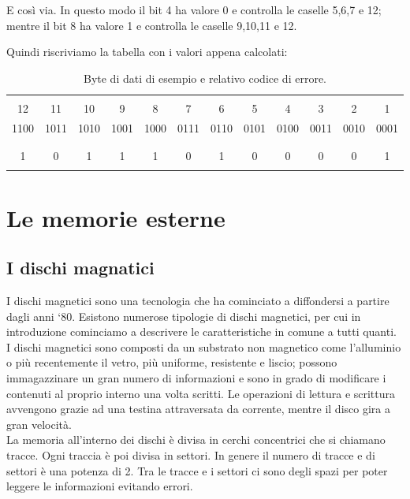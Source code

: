 \documentclass{article}
\begin{document}
 E così via. In questo modo il bit 4 ha valore 0 e controlla le caselle 5,6,7 e 12; mentre il bit 8 ha valore 1 e controlla le caselle 9,10,11 e 12.

 Quindi riscriviamo la tabella con i valori appena calcolati:

 \begin{table}[h]
 	\centering
	\begin{tabular}{|c|c|c|c|c|c|c|c|c|c|c|c|}

		\hline
		&  &  &  &  &  &  &  &  &  &  & \\
		12 & 11 & 10 & 9 & 8 & 7 & 6 & 5 & 4 & 3 & 2 & 1  \\

		1100 & 1011 & 1010 & 1001 & 1000 & 0111 & 0110 & 0101 & 0100 & 0011 & 0010 & 0001 \\
		 &  &  &  &  &  &  &  &  &  &  &  \\
		\hline
		&  &  &  &  &  &  &  &  &  &  &  \\

	   1 & 0 & 1 & 1 & 1 & 0 & 1 & 0 & 0 & 0 & 0 & 1\\

		&  &  &  &  &  &  &  &  &  &  &  \\
		\hline

	\end{tabular}
 	\caption{Byte di dati di esempio e relativo codice di errore.}
 \end{table}

\section{Le memorie esterne}

\subsection{I dischi magnatici}

I dischi magnetici sono una tecnologia che ha cominciato a diffondersi a partire dagli anni `80. Esistono numerose tipologie di dischi magnetici, per cui in introduzione cominciamo a descrivere le caratteristiche in comune a tutti quanti.\\
\indent I dischi magnetici sono composti da un substrato non magnetico come l'alluminio o più recentemente il vetro, più uniforme, resistente e liscio; possono immagazzinare un gran numero di informazioni e sono in grado di modificare i contenuti al proprio interno una volta scritti.
Le operazioni di lettura e scrittura avvengono grazie ad una testina attraversata da corrente, mentre il disco gira a gran velocità.\\
\indent La memoria all'interno dei dischi è divisa in cerchi concentrici che si chiamano tracce. Ogni traccia è poi divisa in settori. In genere il numero di tracce e di settori è una potenza di 2. Tra le tracce e i settori ci sono degli spazi per poter leggere le informazioni evitando errori.
\end{document}
